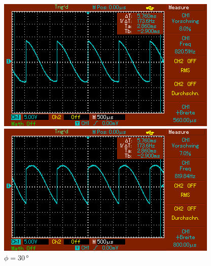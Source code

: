 \begin{figure}
    \begin{minipage}[b]{.45\linewidth} %
       \includegraphics[width=\linewidth]{bilder/MAP003.png}
       \caption{$\phi = 0\,\unit{°}$}
    \end{minipage}
    \hspace{0.1\linewidth}%
    \begin{minipage}[b]{.45\linewidth} %
       \includegraphics[width=\linewidth]{bilder/MAP004.png}
       \caption{$\phi = 30\,\unit{°}$}
    \end{minipage}
\end{figure}

